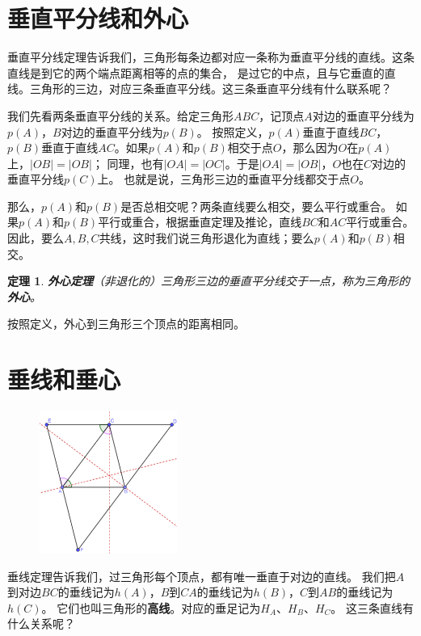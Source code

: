 \documentclass[12pt,UTF8]{ctexbook}
\newtheorem{tm}{定理}[section]
\begin{document}
\section{垂直平分线和外心}
垂直平分线定理告诉我们，三角形每条边都对应一条称为垂直平分线的直线。这条直线是到它的两个端点距离相等的点的集合，
是过它的中点，且与它垂直的直线。三角形的三边，对应三条垂直平分线。这三条垂直平分线有什么联系呢？

我们先看两条垂直平分线的关系。给定三角形$ABC$，记顶点$A$对边的垂直平分线为$p(A)$，$B$对边的垂直平分线为$p(B)$。
按照定义，$p(A)$垂直于直线$BC$，$p(B)$垂直于直线$AC$。如果$p(A)$和$p(B)$相交于点$O$，那么因为$O$在$p(A)$上，$|OB| = |OB|$；
同理，也有$|OA| = |OC|$。于是$|OA| = |OB|$，$O$也在$C$对边的垂直平分线$p(C)$上。
也就是说，三角形三边的垂直平分线都交于点$O$。

那么，$p(A)$和$p(B)$是否总相交呢？两条直线要么相交，要么平行或重合。
如果$p(A)$和$p(B)$平行或重合，根据垂直定理及推论，直线$BC$和$AC$平行或重合。
因此，要么$A,B,C$共线，这时我们说三角形退化为直线；要么$p(A)$和$p(B)$相交。
\begin{tm}{\textbf{外心定理}}\label{tm:1-0-0}
    （非退化的）三角形三边的垂直平分线交于一点，称为三角形的\textbf{外心}。
\end{tm}
按照定义，外心到三角形三个顶点的距离相同。

\section{垂线和垂心}

\begin{figure} %
    \vspace{-45pt}
    \flushright
    \includegraphics[width=0.4\textwidth]{三角形7.png}
\end{figure}

垂线定理告诉我们，过三角形每个顶点，都有唯一垂直于对边的直线。
我们把$A$到对边$BC$的垂线记为$h(A)$，$B$到$CA$的垂线记为$h(B)$，$C$到$AB$的垂线记为$h(C)$。
它们也叫三角形的\textbf{高线}。对应的垂足记为$H_A$、$H_B$、$H_C$。
这三条直线有什么关系呢？
\end{document}
